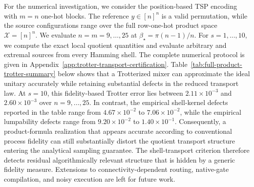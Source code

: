 \documentclass[a4paper,onecolumn,11pt,unpublished]{quantumarticle}
\theoremstyle{remark}
\begin{document}

For the numerical investigation, we consider the position-based TSP encoding
with \(m=n\) one-hot blocks. The reference \(y\in[n]^n\) is a valid
permutation, while the source configurations range over the full row-one-hot
product space \(\mathcal X=[n]^n\). We evaluate
\(n=m=9,\ldots,25\) at
\(\beta_\star=\pi(n-1)/n\). For \(s=1,\ldots,10\), we compute the exact local
quotient quantities and evaluate arbitrary and extremal sources from every Hamming shell. The complete numerical protocol is given in Appendix~\ref{app:trotter-transport-certification}. Table~\ref{tab:full-product-trotter-summary} below shows that a Trotterized mixer can approximate the ideal unitary accurately while retaining substantial defects in the reduced transport law. 
At \(s=10\), this fidelity-based Trotter error lies between
\(2.11\times10^{-3}\) and \(2.60\times10^{-3}\) over
\(n=9,\ldots,25\). In contrast, the empirical shell-kernel defects reported
in the table range from \(4.67\times10^{-2}\) to \(7.06\times10^{-2}\),
while the empirical lumpability defects range from \(9.20\times10^{-2}\) to
\(1.40\times10^{-1}\). Consequently, a product-formula realization that
appears accurate according to conventional process fidelity can still
substantially distort the quotient transport structure entering the
analytical sampling guarantee. The shell-transport criterion therefore detects residual algorithmically relevant structure that is hidden by a generic fidelity measure. Extensions to
connectivity-dependent routing, native-gate compilation, and noisy execution are left for future work.
\end{document}
